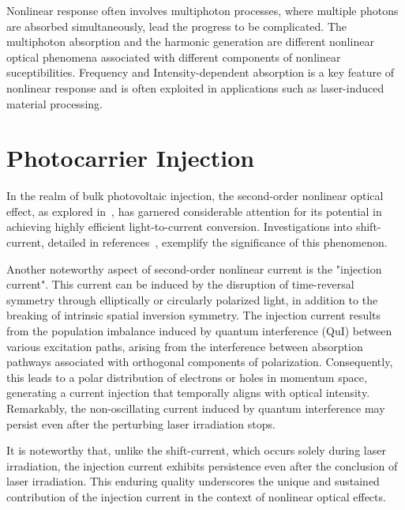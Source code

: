 Nonlinear response often involves multiphoton processes, where multiple photons are absorbed
simultaneously, lead the progress to be complicated. The multiphoton absorption and the harmonic
generation are different nonlinear optical phenomena associated with different components of
nonlinear suceptibilities.
Frequency and Intensity-dependent absorption is a key feature of nonlinear response and is often exploited in applications such as laser-induced material processing.

\section{Photocarrier Injection}
In the realm of bulk photovoltaic injection, the second-order nonlinear optical effect, as explored in~\cite{PhysRevB.61.5337}, has garnered considerable attention for its potential in achieving highly efficient light-to-current conversion. Investigations into shift-current, detailed in references~\cite{PhysRevLett.107.126805,doi:10.1126/science.1168636,Yang2010,10.1063/5.0101513}, exemplify the significance of this phenomenon.

Another noteworthy aspect of second-order nonlinear current is the "injection
current"\cite{sipe2000second,laman2005ultrafast,
10.1063/1.125084,PhysRevB.61.5337,10.1063/1.2131191}. This current can be induced by the disruption
of time-reversal symmetry through elliptically or circularly polarized light, in addition to the
breaking of intrinsic spatial inversion symmetry. The injection current results from the population
imbalance induced by quantum interference (\gls{QuI}) between various excitation paths, arising
from the interference between absorption pathways associated with orthogonal components of
polarization. Consequently, this leads to a polar distribution of electrons or holes in momentum
space, generating a current injection that temporally aligns with optical intensity. Remarkably,
the non-oscillating current induced by quantum interference may persist even after the perturbing
laser irradiation stops.

It is noteworthy that, unlike the shift-current, which occurs solely during laser irradiation, the injection current exhibits persistence even after the conclusion of laser irradiation. This enduring quality underscores the unique and sustained contribution of the injection current in the context of nonlinear optical effects.

